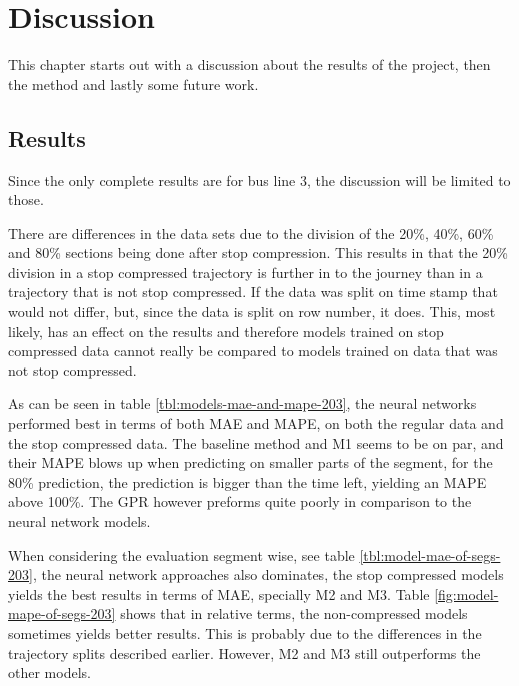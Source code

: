 
\chapter{Discussion}
\label{cha:discussion}

This chapter starts out with a discussion about the results of the project, then the method and lastly some future work.

\section{Results}
\label{sec:discussion-results} 
Since the only complete results are for bus line 3, the discussion will be limited to those. 

There are differences in the data sets due to the division of the 20\%, 40\%, 60\% and 80\% sections being done after stop compression. This results in that the 20\% division in a stop compressed trajectory is further in to the journey than in a trajectory that is not stop compressed. If the data was split on time stamp that would not differ, but, since the data is split on row number, it does. This, most likely, has an effect on the results and therefore models trained on stop compressed data cannot really be compared to models trained on data that was not stop compressed.

As can be seen in table \ref{tbl:models-mae-and-mape-203}, the neural networks performed best in terms of both MAE and MAPE, on both the regular data and the stop compressed data. The baseline method and M1 seems to be on par, and their MAPE blows up when predicting on smaller parts of the segment, for the 80\% prediction, the prediction is bigger than the time left, yielding an MAPE above 100\%. The GPR however preforms quite poorly in comparison to the neural network models.

When considering the evaluation segment wise, see table \ref{tbl:model-mae-of-segs-203}, the neural network approaches also dominates, the stop compressed models yields the best results in terms of MAE, specially M2 and M3. Table \ref{fig:model-mape-of-segs-203} shows that in relative terms, the non-compressed models sometimes yields better results. This is probably due to the differences in the trajectory splits described earlier. However, M2 and M3 still outperforms the other models.

